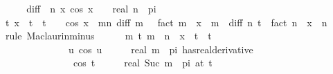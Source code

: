 \begin{isabellebody}
%
\isadelimproof
%
\endisadelimproof
%
\isatagproof
{}\isamarkupfalse%
\ {\isacharminus}{\kern0pt}\isanewline
\ \ \isamarkupfalse%
\ {\isacharquery}{\kern0pt}diff\ {\isacharequal}{\kern0pt}\ {\isachardoublequoteopen}{\isasymlambda}n\ x{\isachardot}{\kern0pt}\ cos\ {\isacharparenleft}{\kern0pt}x\ {\isacharplus}{\kern0pt}\ {}{\isacharslash}{\kern0pt}{}\ {\isacharasterisk}{\kern0pt}\ real\ n\ {\isacharasterisk}{\kern0pt}\ pi{\isacharparenright}{\kern0pt}{\isachardoublequoteclose}\isanewline
\ \ \isamarkupfalse%
\ {\isachardoublequoteopen}{\isasymexists}t{\isachardot}{\kern0pt}\ x\ {\isacharless}{\kern0pt}\ t\ {\isasymand}\ t\ {\isacharless}{\kern0pt}\ {}\ {\isasymand}\ cos\ x\ {\isacharequal}{\kern0pt}\ {\isacharparenleft}{\kern0pt}{\isasymSum}m{\isacharless}{\kern0pt}n{\isachardot}{\kern0pt}\ {\isacharquery}{\kern0pt}diff\ m\ {}\ {\isacharslash}{\kern0pt}\ {\isacharparenleft}{\kern0pt}fact\ m{\isacharparenright}{\kern0pt}\ {\isacharasterisk}{\kern0pt}\ x\ {\isacharcircum}{\kern0pt}\ m{\isacharparenright}{\kern0pt}\ {\isacharplus}{\kern0pt}\ {\isacharquery}{\kern0pt}diff\ n\ t\ {\isacharslash}{\kern0pt}\ fact\ n\ {\isacharasterisk}{\kern0pt}\ x\ {\isacharcircum}{\kern0pt}\ n{\isachardoublequoteclose}\isanewline
\ \ \isamarkupfalse%
\ {\isacharparenleft}{\kern0pt}rule\ Maclaurin{\isacharunderscore}{\kern0pt}minus{\isacharparenright}{\kern0pt}\isanewline
\ \ \ \ \isamarkupfalse%
\ {\isachardoublequoteopen}{\isasymforall}m\ t{\isachardot}{\kern0pt}\ m\ {\isacharless}{\kern0pt}\ n\ {\isasymand}\ x\ {\isasymle}\ t\ {\isasymand}\ t\ {\isasymle}\ {}\ {\isasymlongrightarrow}\isanewline
\ \ \ \ \ \ \ \ \ \ \ \ \ \ {\isacharparenleft}{\kern0pt}{\isacharparenleft}{\kern0pt}{\isasymlambda}u{\isachardot}{\kern0pt}\ cos\ {\isacharparenleft}{\kern0pt}u\ {\isacharplus}{\kern0pt}\ {}\ {\isacharslash}{\kern0pt}\ {}\ {\isacharasterisk}{\kern0pt}\ real\ m\ {\isacharasterisk}{\kern0pt}\ pi{\isacharparenright}{\kern0pt}{\isacharparenright}{\kern0pt}\ has{\isacharunderscore}{\kern0pt}real{\isacharunderscore}{\kern0pt}derivative\ \isanewline
\ \ \ \ \ \ \ \ \ \ \ \ \ \ \ cos\ {\isacharparenleft}{\kern0pt}t\ {\isacharplus}{\kern0pt}\ {}\ {\isacharslash}{\kern0pt}\ {}\ {\isacharasterisk}{\kern0pt}\ real\ {\isacharparenleft}{\kern0pt}Suc\ m{\isacharparenright}{\kern0pt}\ {\isacharasterisk}{\kern0pt}\ pi{\isacharparenright}{\kern0pt}{\isacharparenright}{\kern0pt}\ {\isacharparenleft}{\kern0pt}at\ t{\isacharparenright}{\kern0pt}{\isachardoublequoteclose}\isanewline

\end{isabellebody}
